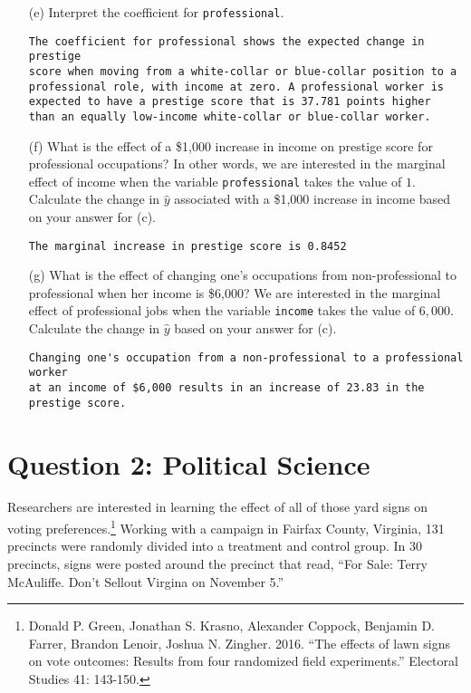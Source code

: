 \documentclass[12pt,letterpaper]{article}
\begin{document}
\begin{enumerate}
	\item [(e)]
	Interpret the coefficient for \texttt{professional}.
	\begin{verbatim}
The coefficient for professional shows the expected change in prestige 
score when moving from a white-collar or blue-collar position to a 
professional role, with income at zero. A professional worker is 
expected to have a prestige score that is 37.781 points higher 
than an equally low-income white-collar or blue-collar worker.
	\end{verbatim}
	
	\item [(f)]
	What is the effect of a \$1,000 increase in income on prestige score for professional occupations? In other words, we are interested in the marginal effect of income when the variable \texttt{professional} takes the value of $1$. Calculate the change in $\hat{y}$ associated with a \$1,000 increase in income based on your answer for (c).
	
	\begin{verbatim}
The marginal increase in prestige score is 0.8452
	\end{verbatim}
	
	\item [(g)]
	What is the effect of changing one's occupations from non-professional to professional when her income is \$6,000? We are interested in the marginal effect of professional jobs when the variable \texttt{income} takes the value of $6,000$. Calculate the change in $\hat{y}$ based on your answer for (c).
	
	\begin{verbatim}
Changing one's occupation from a non-professional to a professional worker 
at an income of $6,000 results in an increase of 23.83 in the prestige score.
	\end{verbatim}
\end{enumerate}

\newpage

\section*{Question 2: Political Science}
\vspace{.25cm}
\noindent 	Researchers are interested in learning the effect of all of those yard signs on voting preferences.\footnote{Donald P. Green, Jonathan	S. Krasno, Alexander Coppock, Benjamin D. Farrer,	Brandon Lenoir, Joshua N. Zingher. 2016. ``The effects of lawn signs on vote outcomes: Results from four randomized field experiments.'' Electoral Studies 41: 143-150. } Working with a campaign in Fairfax County, Virginia, 131 precincts were randomly divided into a treatment and control group. In 30 precincts, signs were posted around the precinct that read, ``For Sale: Terry McAuliffe. Don't Sellout Virgina on November 5.'' \\
\end{document}
